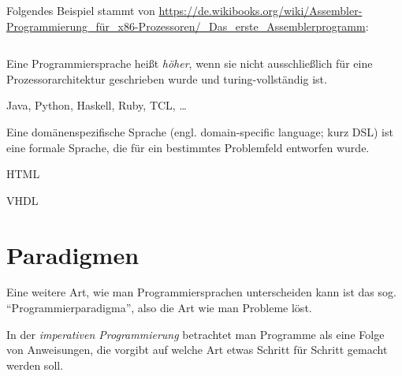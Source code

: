\begin{beispiel}[Assembler]%
    Folgendes Beispiel stammt von \url{https://de.wikibooks.org/wiki/Assembler-Programmierung_für_x86-Prozessoren/_Das_erste_Assemblerprogramm}:
    \inputminted[linenos, numbersep=5pt, tabsize=4, frame=lines, label=firstp.asm]{nasm}{scripts/assembler/firstp.asm}
\end{beispiel}

\begin{definition}%
    Eine Programmiersprache heißt \textit{höher}, wenn sie nicht ausschließlich
    für eine Prozessorarchitektur geschrieben wurde und turing-vollständig ist.
\end{definition}

\begin{beispiel}
    Java, Python, Haskell, Ruby, TCL, \dots
\end{beispiel}

\begin{definition}%
    Eine domänenspezifische Sprache (engl. domain-specific language; kurz DSL)
    ist eine formale Sprache, die für ein bestimmtes Problemfeld
    entworfen wurde.
\end{definition}

\begin{beispiel}
    \begin{bspenum}
        \item HTML
        \item VHDL
    \end{bspenum}
\end{beispiel}

\section{Paradigmen}
Eine weitere Art, wie man Programmiersprachen unterscheiden
kann ist das sog. \enquote{Programmierparadigma}, also die Art wie
man Probleme löst.

\begin{definition}%
    In der \textit{imperativen Programmierung} betrachtet man Programme als
    eine Folge von Anweisungen, die vorgibt auf welche Art etwas
    Schritt für Schritt gemacht werden soll.
\end{definition}

